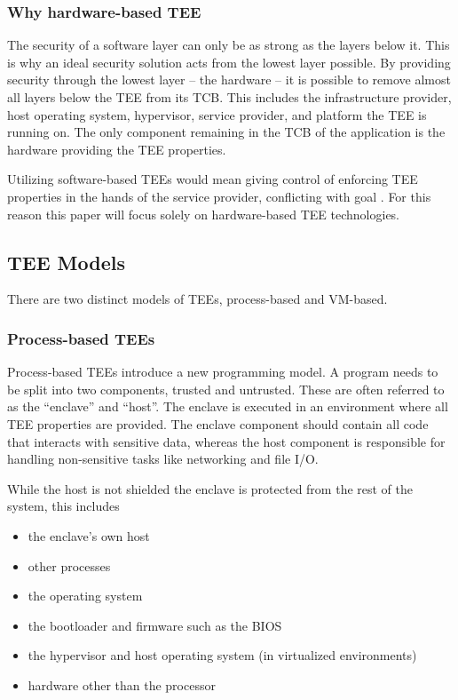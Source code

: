 \subsubsection{Why hardware-based TEE}

The security of a software layer can only be as strong as the layers below it.
This is why an ideal security solution acts from the lowest layer possible. By
providing security through the lowest layer -- the hardware -- it is possible to
remove almost all layers below the TEE from its TCB. This includes the
infrastructure provider, host operating system, hypervisor, service provider,
and platform the TEE is running on. The only component remaining in the TCB of
the application is the hardware providing the TEE properties.

Utilizing software-based TEEs would mean giving control of enforcing TEE
properties in the hands of the service provider, conflicting with goal
. For this reason this paper will focus solely on
hardware-based TEE technologies.

\subsection{TEE Models}

There are two distinct models of TEEs, process-based and VM-based.

\subsubsection{Process-based TEEs}

Process-based TEEs introduce a new programming model. A program needs to be
split into two components, trusted and untrusted. These are often referred to as
the ``enclave'' and ``host''. The enclave is executed in an environment where
all TEE properties are provided. The enclave component should contain all code
that interacts with sensitive data, whereas the host component is responsible
for handling non-sensitive tasks like networking and file I/O.

While the host is not shielded the enclave is protected from the rest of the
system, this includes

\begin{itemize}
  \item the enclave's own host
  \item other processes
  \item the operating system
  \item the bootloader and firmware such as the BIOS
  \item the hypervisor and host operating system (in virtualized environments)
  \item hardware other than the processor
\end{itemize}

